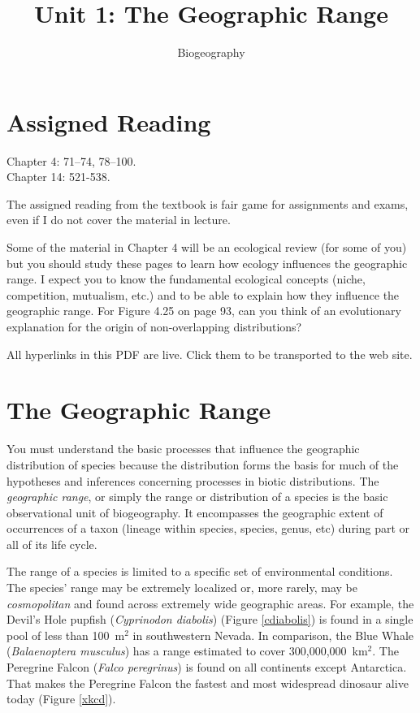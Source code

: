 \documentclass[11pt, hidelinks]{article}
\title{Unit 1: The Geographic Range}
\author{Biogeography}
\date{}
\begin{document}
\maketitle
\section{Assigned Reading}
Chapter 4: 71--74, 78--100. \\
Chapter 14: 521-538.

The assigned reading from the textbook is fair game for assignments and exams, even if I do not cover the material in  lecture.

Some of the material in Chapter 4 will be an ecological review (for some of you) but you should study these pages to learn how ecology influences the geographic range.  I expect you to know the fundamental ecological concepts (niche, competition, mutualism, etc.) and to be able to explain how they influence the geographic range.  For Figure 4.25 on page 93, can you think of an evolutionary explanation for the origin of non-overlapping distributions?

All hyperlinks in this PDF are live. Click them to be transported to the web site.

\section{The Geographic Range}

You must understand the basic processes that influence the geographic distribution of species because the distribution forms the basis for much of the hypotheses and inferences concerning processes in biotic distributions. The \emph{geographic range}, or simply the range or distribution of a species is the basic observational unit of biogeography. It encompasses the geographic extent of occurrences of a taxon (lineage within species, species, genus, etc) during part or all of its life cycle. 

The range of a species is limited to a specific set of environmental conditions. The species' range may be  extremely localized or, more rarely, may be \emph{cosmopolitan} and found across extremely wide geographic areas. For example, the Devil's Hole pupfish (\emph {Cyprinodon diabolis}) (Figure \ref{cdiabolis}) is found in a single pool of less than 100~m$^2$ in southwestern Nevada. In comparison, the Blue Whale (\emph{Balaenoptera musculus}) has a range estimated to cover 300,000,000~km$^2$.  The Peregrine Falcon (\emph{Falco peregrinus}) is found on all continents except Antarctica. That makes the Peregrine Falcon  the fastest and most widespread dinosaur alive today (Figure \ref{xkcd}).
\end{document}
